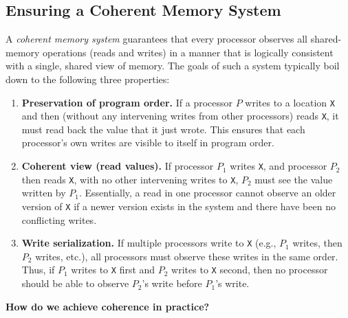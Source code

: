 \subsection{Ensuring a Coherent Memory System}
A \emph{coherent memory system} guarantees that every processor observes
all shared-memory operations (reads and writes) in a manner that is
logically consistent with a single, shared view of memory. The goals of
such a system typically boil down to the following three properties:

\begin{enumerate}
  \item \textbf{Preservation of program order.} If a processor $P$
  writes to a location \texttt{X} and then (without any intervening
  writes from other processors) reads \texttt{X}, it must read back the
  value that it just wrote. This ensures that each processor's own
  writes are visible to itself in program order.

  \item \textbf{Coherent view (read values).} If processor $P_1$ writes
  \texttt{X}, and processor $P_2$ then reads \texttt{X}$\!$, with no
  other intervening writes to \texttt{X}, $P_2$ must see the value
  written by $P_1$. Essentially, a read in one processor cannot observe
  an older version of \texttt{X}$\!$ if a newer version exists in the
  system and there have been no conflicting writes.

  \item \textbf{Write serialization.} If multiple processors write to
  \texttt{X} (e.g., $P_1$ writes, then $P_2$ writes, etc.), all
  processors must observe these writes in the same order. Thus, if $P_1$
  writes to \texttt{X}$\!$ first and $P_2$ writes to \texttt{X}$\!$
  second, then no processor should be able to observe $P_2$'s write
  before $P_1$'s write.
\end{enumerate}

\medskip

\noindent
\textbf{How do we achieve coherence in practice?}


